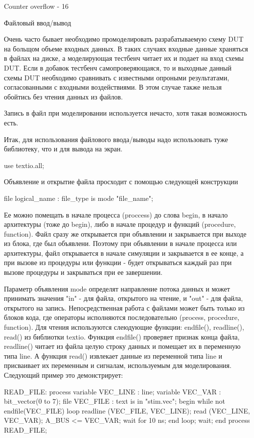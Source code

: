 Counter overflow - 16



Файловый ввод/вывод

Очень часто бывает необходимо промоделировать разрабатываемую схему DUT на больщом объеме входных данных. В таких случаях входные данные храняться в файлах на диске, а моделирующая тестбенч читает их и подает на вход схемы DUT. Если в добавок тестбенч самопроверяющаяся, то и выходные данный схемы DUT необходимо сравнивать с известными опроными результатами, согласованными с входными воздействиями. В этом случае также нельзя обойтись без чтения данных из файлов.

Запись в файл при моделировании используется нечасто, хотя такая возможность есть. 

Итак, для использования файлового ввода/выводы надо использовать туже библиотеку, что и для вывода на экран.

use textio.all;

Объявление и открытие файла просходит с помощью следующей конструкции

file logical_name : file_type is mode "file_name";

Ее можно помещать в начале процесса (proccess) до слова begin, в начало архитектуры (тоже до begin), либо в начале процедур и функций (procedure, function). Файл сразу же открывается при объявлении и закрывается при выходе из блока, где был объявлени. Поэтому при объявлении в начале процесса или архитектуры, файл открывается в начале симуляции и закрывается в ее конце, а при вызове из процедуры или функции - будет открываться каждый раз при вызове процедуры и закрываться при ее завершении. 

Параметр объявления mode определят направление потока данных и может принимать значения "in" - для файла, открытого на чтение, и "out" - для файла, открытого на запись. Непосредственная работа с файлами может быть только из блоков кода, где операторы исполняются последовательно (process, procedure, function). Для чтения используются слеюдующие функции: endfile(), readline(), read() из библиотки textio. Функция endfile() проверяет признак конца файла, readline() читает из файла целую строку данных и помещает их в переменную типа line. А функция read() извлекает данные из переменной типа line и присваивает их переменным и сигналам, используемым для моделирования. Следующий пример это демонстрирует:

READ_FILE: process
  variable VEC_LINE : line;
  variable VEC_VAR : bit_vector(0 to 7);
  file VEC_FILE : text is in "stim.vec";
begin
  while not endfile(VEC_FILE) loop
    readline (VEC_FILE, VEC_LINE);
    read (VEC_LINE, VEC_VAR);
    A_BUS <= VEC_VAR;
    wait for 10 ns;
  end loop;
  wait;
end process READ_FILE;


